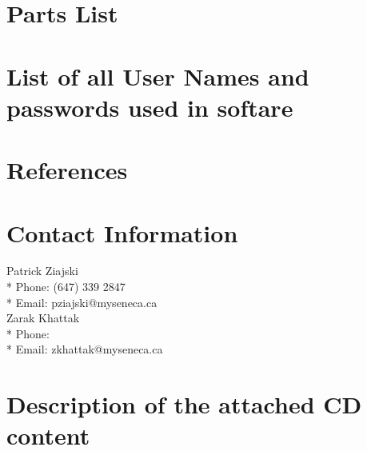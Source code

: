 \documentclass[a4paper,12pt]{article}
\begin{document}
\section{Parts List}

\section{List of all User Names and passwords used in softare}

\section{References}

\newpage
\section{Contact Information}
\begin{center}
    Patrick Ziajski \\*
    Phone: (647) 339 2847 \\*
    Email: pziajski@myseneca.ca \\
    \vspace{5mm}
    Zarak Khattak \\*
    Phone: \\*
    Email: zkhattak@myseneca.ca
\end{center}

\newpage
\section{Description of the attached CD content}
\end{document}
